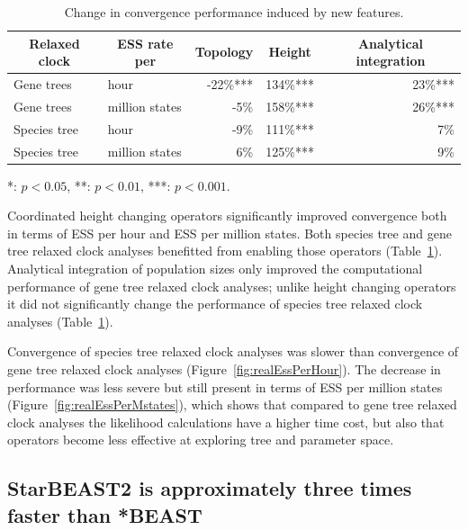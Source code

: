 \documentclass[12pt]{article}
\begin{document}
\begin{table}[htb!]
\centering
\caption{Change in convergence performance induced by new features.}
\label{tab:convergenceLM}
\begin{threeparttable}
\begin{adjustbox}{center}
\begin{tabular}{|l|l|r|r|r|}
\hline
\multicolumn{1}{|c|}{Relaxed clock} & \multicolumn{1}{c|}{ESS rate per} & \multicolumn{1}{c|}{Topology} & \multicolumn{1}{c|}{Height} & \multicolumn{1}{c|}{Analytical integration}\tabularnewline
\hline
Gene trees & hour & -22\%{***} & 134\%{***} & 23\%{***}\tabularnewline
\hline
Gene trees & million states & -5\%\hphantom{***} & 158\%{***} & 26\%{***}\tabularnewline
\hline
Species tree & hour & -9\%\hphantom{***} & 111\%{***} & 7\%\hphantom{***}\tabularnewline
\hline
Species tree & million states & 6\%\hphantom{***} & 125\%{***} & 9\%\hphantom{***}\tabularnewline
\hline
\end{tabular}
\end{adjustbox}
\begin{tablenotes}
\small
\item \hspace{1cm} {*}: $p < 0.05$, {**}: $p < 0.01$, {***}: $p < 0.001$.
\end{tablenotes}
\end{threeparttable}
\end{table}

Coordinated height changing operators significantly improved convergence both in
terms of ESS per hour and ESS per million states. Both species tree and gene
tree relaxed clock analyses benefitted from enabling those operators (Table~\ref{tab:convergenceLM}). Analytical
integration of population sizes only improved the computational performance of
gene tree relaxed clock analyses; unlike height changing operators it did not
significantly change the performance of species tree relaxed clock analyses
(Table~\ref{tab:convergenceLM}).

Convergence of species tree relaxed clock analyses was slower than convergence
of gene tree relaxed clock analyses (Figure~\ref{fig:realEssPerHour}). The
decrease in performance was less severe but still present in terms of ESS per
million states (Figure~\ref{fig:realEssPerMstates}), which shows that compared
to gene tree relaxed clock analyses the likelihood calculations have a higher
time cost, but also that operators become less effective at exploring tree and
parameter space.

\subsection*{StarBEAST2 is approximately three times faster than *BEAST}
\end{document}
